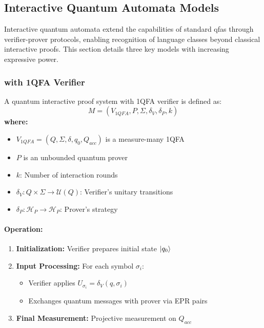 \subsection{Interactive Quantum Automata Models}
\label{sec:interactive-quantum}

Interactive quantum automata extend the capabilities of standard \glspl{qfa} through verifier-prover protocols, enabling recognition of language classes beyond classical interactive proofs. This section details three key models with increasing expressive power.

\subsubsection{ with 1QFA Verifier}
\label{subsec:qip1qfa}

\begin{definition}
A quantum interactive proof system with 1QFA verifier is defined as:
\[
M = (V_{1QFA}, P, \Sigma, \delta_V, \delta_P, k)
\]
\textbf{where:}
\begin{itemize}
    \item $V_{1QFA} = (Q, \Sigma, \delta, q_0, Q_{acc})$ is a measure-many 1QFA
    \item $P$ is an unbounded quantum prover
    \item $k$: Number of interaction rounds
    \item $\delta_V: Q \times \Sigma \rightarrow \mathcal{U}(Q)$: Verifier's unitary transitions
    \item $\delta_P: \mathcal{H}_P \rightarrow \mathcal{H}_P$: Prover's strategy
\end{itemize}
\end{definition}

\paragraph{Operation:}
\begin{enumerate}
    \item \textbf{Initialization:} Verifier prepares initial state $\ket{q_0}$
    \item \textbf{Input Processing:} For each symbol $\sigma_i$:
    \begin{itemize}
        \item Verifier applies $U_{\sigma_i} = \delta_V(q, \sigma_i)$
        \item Exchanges quantum messages with prover via EPR pairs
    \end{itemize}
    \item \textbf{Final Measurement:} Projective measurement on $Q_{acc}$
\end{enumerate}

